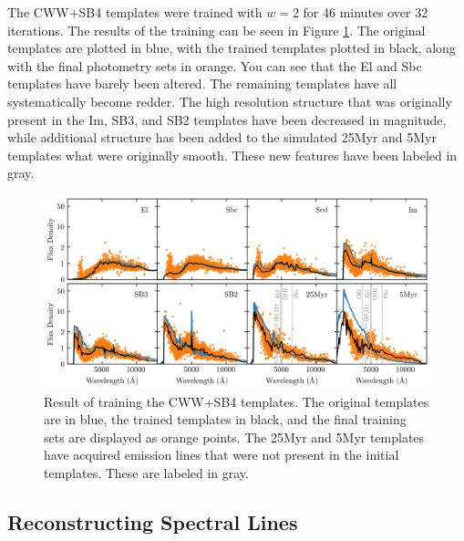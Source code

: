 The CWW+SB4 templates were trained with $w=2$ for 46 minutes over 32 iterations.
The results of the training can be seen in Figure \ref{fig:cwwsb4_trained}.
The original templates are plotted in blue, with the trained templates plotted in black, along with the final photometry sets in orange.
You can see that the El and Sbc templates have barely been altered. The remaining templates have all systematically become redder.
The high resolution structure that was originally present in the Im, SB3, and SB2 templates have been decreased in magnitude, while additional structure has been added to the simulated 25Myr and 5Myr templates what were originally smooth.
These new features have been labeled in gray.

\begin{figure}
    \centering
    \includegraphics{figures/cwwsb4_trained.png}
    \caption{Result of training the CWW+SB4 templates. The original templates are in blue, the trained templates in black, and the final training sets are displayed as orange points. The 25Myr and 5Myr templates have acquired emission lines that were not present in the initial templates. These are labeled in gray.}
    \label{fig:cwwsb4_trained}
\end{figure}



\subsection{Reconstructing Spectral Lines}
\label{sect:speclines}

